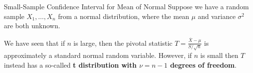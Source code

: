 \documentclass[handout]{beamer}
\renewcommand{\emph}{\textbf}
\begin{document}


\begin{frame}{Small-Sample Confidence Interval for Mean of Normal}
Suppose we have a random sample $X_1,\dots,X_n$ from a normal distribution, where the mean $\mu$ and variance $\sigma^2$ are both unknown. 

We have seen that if $n$ is large, then the pivotal statistic $T=\frac{\overline{X}-\mu}{S/\sqrt{n}}$ is approximately a standard normal random variable. However, if $n$ is small then $T$ instead has a so-called \emph{t distribution with $\nu=n-1$ degrees of freedom}.
\end{frame}
\end{document}
